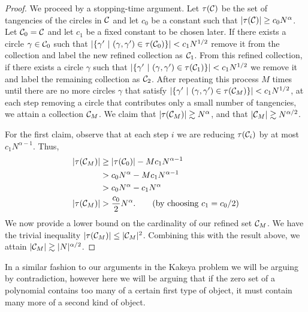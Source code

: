\begin{proof}
We proceed by a stopping-time argument.
Let $\tau(\mathcal C)$ be the set of tangencies of the circles in $\mathcal C$ and let $c_0$ be a constant such that $|\tau(\mathcal C)| \geq c_0 N^{\alpha}$. Let $\mathcal C_0 = \mathcal C$ and let $c_1$ be a fixed constant to be chosen later. If there exists a circle $\gamma \in \mathcal C_0$ such that $|\{ \gamma' \ |\ (\gamma, \gamma') \in \tau(\mathcal C_0)\}| < c_1 N^{1/2}$
remove it from the collection and label the new refined collection as $\mathcal C_1$. From this refined collection, if there exists a circle $\gamma$ such that $|\{\gamma'\ |\ (\gamma, \gamma') \in \tau(\mathcal C_1)\}| < c_1 N^{1/2}$ we remove it and label the remaining collection as $\mathcal C_2$.
After repeating this process $M$ times until there are no more circles $\gamma$ that satisfy $|\{\gamma'\ |\ (\gamma, \gamma') \in \tau(\mathcal C_M)\}| < c_1 N^{1/2}$, at each step removing a circle that contributes only a small number of tangencies, we attain a collection $\mathcal C_M$.
 We claim that $|\tau(\mathcal C_M)| \gtrsim N^{\alpha}$, and that $|\mathcal C_M| \gtrsim N^{\alpha/2}$.

For the first claim, observe that at each step $i$ we are reducing $\tau(\mathcal C_i)$ by at most $c_1 N^{\alpha -1}$.  Thus,
\begin{align*}
    |\tau(\mathcal C_M)| &\geq |\tau(\mathcal C_0)| - M c_1 N^{\alpha -1} \\
    &> c_0 N^{\alpha} -  M c_1 N^{\alpha -1} \\ 
    &> c_0 N^{\alpha} - c_1 N^{\alpha} \\
    |\tau(\mathcal C_M)| &> \frac{c_0}{2} N^{\alpha}. \qquad (\text{by choosing } c_1 = c_0/2 )
\end{align*}
We now provide a lower bound on the cardinality of our refined set $\mathcal C_M$. We have the trivial inequality $|\tau(\mathcal C_M)| \leq |\mathcal C_M|^{2}$. 
Combining this with the result above, we attain $|\mathcal C_M| \gtrsim |N|^{\alpha/2}$.
\end{proof}
In a similar fashion to our arguments in the Kakeya problem we will be arguing by contradiction, however here we will be arguing that if the zero set of a polynomial contains too many of a certain first type of object, 
it must contain many more of a second kind of object. 




